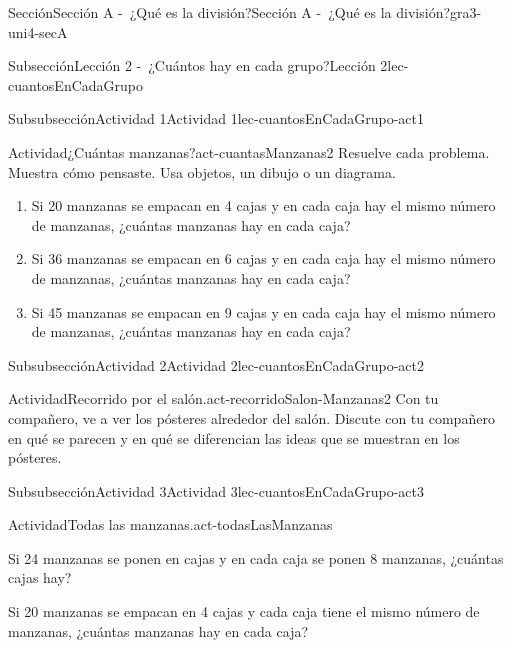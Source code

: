 \documentclass[twoside,10pt,]{article}
\begin{document}
\begin{sectionptx}{Sección}{Sección A -~¿Qué es la división?}{}{Sección A -~¿Qué es la división?}{}{}{gra3-uni4-secA}
\begin{subsectionptx}{Subsección}{Lección 2 -~¿Cuántos hay en cada grupo?}{}{Lección 2}{}{}{lec-cuantosEnCadaGrupo}
\begin{subsubsectionptx}{Subsubsección}{Actividad 1}{}{Actividad 1}{}{}{lec-cuantosEnCadaGrupo-act1}
\begin{activity}{Actividad}{¿Cuántas manzanas?}{act-cuantasManzanas2}
Resuelve cada problema. Muestra cómo pensaste. Usa objetos, un dibujo o un diagrama.%
\par
%
\begin{enumerate}
\item{}Si 20 manzanas se empacan en 4 cajas y en cada caja hay el mismo número de manzanas, ¿cuántas manzanas hay en cada caja?%
\item{}Si 36 manzanas se empacan en 6 cajas y en cada caja hay el mismo número de manzanas, ¿cuántas manzanas hay en cada caja?%
\item{}Si 45 manzanas se empacan en 9 cajas y en cada caja hay el mismo número de manzanas, ¿cuántas manzanas hay en cada caja?%
\end{enumerate}
%
\end{activity}%
\end{subsubsectionptx}
%
%
\typeout{************************************************}
\typeout{************************************************}
%
\begin{subsubsectionptx}{Subsubsección}{Actividad 2}{}{Actividad 2}{}{}{lec-cuantosEnCadaGrupo-act2}
\begin{activity}{Actividad}{Recorrido por el salón.}{act-recorridoSalon-Manzanas2}%
Con tu compañero, ve a ver los pósteres alrededor del salón. Discute con tu compañero en qué se parecen y en qué se diferencian las ideas que se muestran en los pósteres.%
\end{activity}%
\end{subsubsectionptx}
%
%
\typeout{************************************************}
\typeout{************************************************}
%
\begin{subsubsectionptx}{Subsubsección}{Actividad 3}{}{Actividad 3}{}{}{lec-cuantosEnCadaGrupo-act3}
\begin{activity}{Actividad}{Todas las manzanas.}{act-todasLasManzanas}%
\begin{sidebyside}{2}{0.05}{0.05}{0.1}%
\begin{sbspanel}{0.4}%
Si 24 manzanas se ponen en cajas y en cada caja se ponen 8 manzanas, ¿cuántas cajas hay?%
\end{sbspanel}%
\begin{sbspanel}{0.4}%
\par
Si 20 manzanas se empacan en 4 cajas y cada caja tiene el mismo número de manzanas, ¿cuántas manzanas hay en cada caja?%
\end{sbspanel}%
\end{sidebyside}%

\end{activity}
\end{subsubsectionptx}
\end{subsectionptx}
\end{sectionptx}
\end{document}
